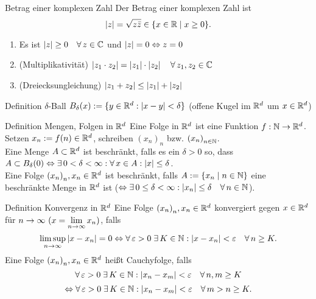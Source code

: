 \documentclass[main.tex]{subfiles}
\begin{document}
\begin{karte}{Betrag einer komplexen Zahl}
    Der Betrag einer komplexen Zahl ist
    \[ |z| = \sqrt{z \bar{z}}\in \{x\in\mathbb{R} \;\vert \; x\geq 0\}. \]
    \begin{enumerate}
        \item Es ist \( \abs{z} \geq 0 
        \quad \forall z\in\C \) und 
        \( \left| z \right| = 0 \Leftrightarrow z = 0 \)
        \item (Multiplikativität) 
        \( \abs{z_1 \cdot z_2} 
        = \abs{z_1} \cdot \abs{z_2} 
        \quad \forall z_1,z_2\in\C \)
        \item (Dreiecksungleichung) 
        \( \left| z_1 + z_2 \right| \leq \left| z_1 \right| + \left| z_2 \right| \)
	\end{enumerate}
\end{karte}
\begin{karte}{Definition \( \delta \)-Ball}
    \( B_\delta(x) := \{ y\in\mathbb{R}^d : \left| x-y \right| < \delta \} \) 
    (offene Kugel im \(\mathbb{R}^d\) um \( x\in\mathbb{R}^d \))
\end{karte}
\begin{karte}{Definition Mengen, Folgen in \( \mathbb{R}^d \)}
    Eine Folge in \( \mathbb{R}^d \) ist eine Funktion 
    \( f: \mathbb{N} \rightarrow \mathbb{R}^d \). \\
    Setzen \(x_n := f(n)\in\mathbb{R}^d \), 
    schreiben \( {(x_n)}_n \) bzw. 
    \({(x_n)}_{n\in\mathbb{N}}\).\\
    Eine Menge \( A\subset \mathbb{R}^d \) 
    ist beschränkt, falls es ein 
    \( \delta > 0\) so, dass \( A\subset B_\delta(0) 
    \Leftrightarrow \exists 0<\delta<\infty:
    \forall x\in A: \abs{x}\leq \delta \).\\
    Eine Folge \( {(x_n)}_n, x_n\in\mathbb{R}^d \) 
    ist beschränkt, falls \(A := \{x_n \;\vert \; n\in\mathbb{N}\} \) 
    eine beschränkte Menge in \( \mathbb{R}^d \) ist 
    (\( \Leftrightarrow \exists 0\leq \delta < \infty: 
    \abs{x_n} \leq \delta \quad \forall n\in\N \)).\\
\end{karte}
\begin{karte}{Definition Konvergenz in \( \mathbb{R}^d \)}
    Eine Folge \( {(x_n)}_n, x_n\in\mathbb{R}^d \) 
    konvergiert gegen \( x\in\mathbb{R}^d \) für 
    \( n\rightarrow \infty \ (x=\lim\limits_{n\rightarrow\infty} x_n) \), falls 
    \[ \limsup\limits_{n\rightarrow\infty} |x-x_n| 
    = 0 \Leftrightarrow \forall \varepsilon 
    > 0 \;\exists K\in\N: |x-x_n| < \varepsilon 
    \quad \forall n\geq K. \]
	Eine Folge \( {(x_n)}_n, x_n\in\mathbb{R}^d \) heißt Cauchyfolge, falls 
    \[ \forall \varepsilon>0 \;\exists K\in\N: 
    |x_n - x_m| < \varepsilon \quad \forall n,m\geq K \]
    \[ \Leftrightarrow \forall \varepsilon > 0 \;\exists K\in\N: 
    |x_n-x_m| < \varepsilon \quad \forall m>n\geq K. \]
\end{karte}
\end{document}
